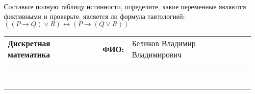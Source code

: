 \documentclass[10pt]{exam}
\newcommand{\class}{Дискретная математика}
\newcommand{\examdate}{}
\begin{document}
\begin{questions}
\begin{enumerate} [a)]
\end{enumerate}\question Составьте полную таблицу истинности, определите, какие переменные являются фиктивными и проверьте, является ли формула тавтологией:
$((P \rightarrow Q) \lor R) \leftrightarrow (P \rightarrow (Q \lor R))$

\end{questions}
\newpage
\begin{flushright}
\begin{tabular}{p{2.8in} r l}
\textbf{\class} & \textbf{ФИО:} &Беликов Владимир Владимирович
\\

\textbf{\examdate} &&\\
\end{tabular}\\
\end{flushright}
\rule[1ex]{\textwidth}{.1pt}
\end{document}

